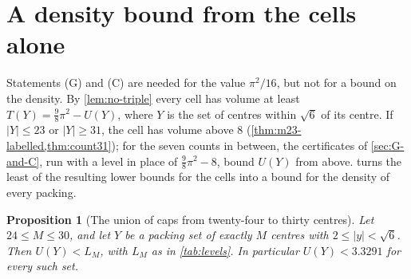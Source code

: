 \documentclass[11pt,reqno]{amsart}
\renewcommand{\_}{\origunderscore\allowbreak}
\numberwithin{equation}{section}
\theoremstyle{plain}
\newtheorem{prop}[thm]{Proposition}
\theoremstyle{definition}
\theoremstyle{remark}
\begin{document}
\section{A density bound from the cells alone}\label{sec:density-cells}

Statements (G) and (C) are needed for the value $\pi^2/16$, but not for a
bound on the density. By \cref{lem:no-triple} every cell has volume at least
$T(Y)=\frac98\pi^2-U(Y)$, where $Y$ is the set of centres within $\sqrt6$ of
its centre. If $|Y|\le23$ or $|Y|\ge31$, the cell has volume above $8$
(\cref{thm:m23-labelled,thm:count31}); for the seven counts in between, the
certificates of \cref{sec:G-and-C}, run with a level in place of
$\frac98\pi^2-8$, bound $U(Y)$ from above.  turns the
least of the resulting lower bounds for the cells into a bound for the
density of every packing.

\begin{prop}[The union of caps from twenty-four to thirty centres]\label{prop:levels}
Let $24\le M\le30$, and let $Y$ be a packing set of exactly $M$ centres with
$2\le|y|<\sqrt6$. Then $U(Y)<L_M$, with $L_M$ as in \cref{tab:levels}. In
particular $U(Y)<3.3291$ for every such set.
\end{prop}
\end{document}
